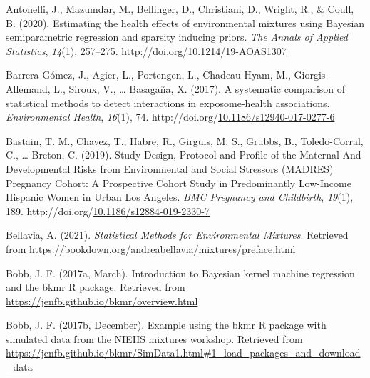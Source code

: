\documentclass[12pt, twoside]{amherstthesis}
\newenvironment{CSLReferences}[2]%
  {}%
  {\par}
\begin{document}
\setlength{\parindent}{-0.20in}
\setlength{\leftskip}{0.20in}
\setlength{\parskip}{8pt}

\hypertarget{refs}{}
\begin{CSLReferences}{1}{0}
\leavevmode{}%
Antonelli, J., Mazumdar, M., Bellinger, D., Christiani, D., Wright, R., \& Coull, B. (2020). Estimating the health effects of environmental mixtures using {Bayesian} semiparametric regression and sparsity inducing priors. \emph{The Annals of Applied Statistics}, \emph{14}(1), 257--275. http://doi.org/\href{https://doi.org/10.1214/19-AOAS1307}{10.1214/19-AOAS1307}

\leavevmode{}%
Barrera-Gómez, J., Agier, L., Portengen, L., Chadeau-Hyam, M., Giorgis-Allemand, L., Siroux, V., \ldots{} Basagaña, X. (2017). A systematic comparison of statistical methods to detect interactions in exposome-health associations. \emph{Environmental Health}, \emph{16}(1), 74. http://doi.org/\href{https://doi.org/10.1186/s12940-017-0277-6}{10.1186/s12940-017-0277-6}

\leavevmode{}%
Bastain, T. M., Chavez, T., Habre, R., Girguis, M. S., Grubbs, B., Toledo-Corral, C., \ldots{} Breton, C. (2019). Study {Design}, {Protocol} and {Profile} of the {Maternal} {And} {Developmental} {Risks} from {Environmental} and {Social} {Stressors} ({MADRES}) {Pregnancy} {Cohort}: A {Prospective} {Cohort} {Study} in {Predominantly} {Low}-{Income} {Hispanic} {Women} in {Urban} {Los} {Angeles}. \emph{BMC Pregnancy and Childbirth}, \emph{19}(1), 189. http://doi.org/\href{https://doi.org/10.1186/s12884-019-2330-7}{10.1186/s12884-019-2330-7}

\leavevmode{}%
Bellavia, A. (2021). \emph{Statistical {Methods} for {Environmental} {Mixtures}}. Retrieved from \url{https://bookdown.org/andreabellavia/mixtures/preface.html}

\leavevmode{}%
Bobb, J. F. (2017a, March). Introduction to {Bayesian} kernel machine regression and the bkmr {R} package. Retrieved from \url{https://jenfb.github.io/bkmr/overview.html}

\leavevmode{}%
Bobb, J. F. (2017b, December). Example using the bkmr {R} package with simulated data from the {NIEHS} mixtures workshop. Retrieved from \url{https://jenfb.github.io/bkmr/SimData1.html\#1_load_packages_and_download_data}


\end{CSLReferences}
\end{document}
